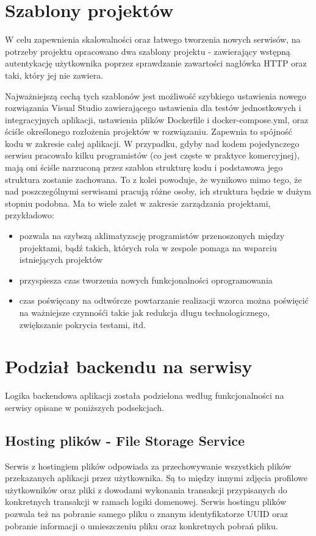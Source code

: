 \documentclass{SGGW-thesis}
\begin{document}
  \section{Szablony projektów}
  W celu zapewnienia skalowalności oraz łatwego tworzenia nowych serwisów, na potrzeby projektu opracowano dwa szablony projektu - zawierający wstępną autentykację użytkownika poprzez sprawdzanie zawartości nagłówka HTTP oraz taki, który jej nie zawiera.

  Najważniejszą cechą tych szablonów jest możliwość szybkiego ustawienia nowego rozwiązania Visual Studio zawierającego ustawienia dla testów jednostkowych i integracyjnych aplikacji, ustawienia plików Dockerfile i docker-compose.yml, oraz ściśle określonego rozłożenia projektów w rozwiązaniu. Zapewnia to spójność kodu w zakresie całej aplikacji. W przypadku, gdyby nad kodem pojedynczego serwisu pracowało kilku programistów (co jest częste w praktyce komercyjnej), mają oni ściśle narzuconą przez szablon strukturę kodu i podstawowa jego struktura zostanie zachowana. To z kolei powoduje, że wynikowo mimo tego, że nad poszczególnymi serwisami pracują różne osoby, ich struktura będzie w dużym stopniu podobna. Ma to wiele zalet w zakresie zarządzania projektami, przykładowo:

  \begin{itemize}
    \item pozwala na szybszą aklimatyzację programistów przenoszonych między projektami, bądź takich, których rola w zespole pomaga na wsparciu istniejących projektów
    \item przyspiesza czas tworzenia nowych funkcjonalności oprogramowania
    \item czas poświęcany na odtwórcze powtarzanie realizacji wzorca można poświęcić na ważniejsze czynnośći takie jak redukcja długu technologicznego, zwiększanie pokrycia testami, itd.
  \end{itemize}

  \section{Podział backendu na serwisy}
    Logika backendowa aplikacji została podzielona według funkcjonalności na serwisy opisane w poniższych podsekcjach.

    \subsection{Hosting plików - File Storage Service}
    Serwis z hostingiem plików odpowiada za przechowywanie wszystkich plików przekazanych aplikacji przez użytkownika. Są to między innymi zdjęcia profilowe użytkowników oraz pliki z dowodami wykonania transakcji przypisanych do konkretnych transakcji w ramach logiki domenowej. Serwis hostingu plików pozwala też na pobranie samego pliku o znanym identyfikatorze UUID oraz pobranie informacji o umieszczeniu pliku oraz konkretnych pobrań pliku.
    
\end{document}
